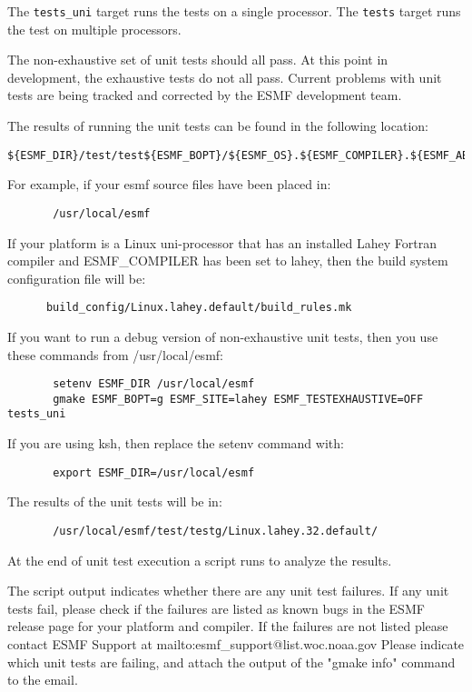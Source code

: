 The {\tt tests\_uni} target runs the tests on a single processor. 
The {\tt tests} target runs the test on multiple processors.

The non-exhaustive set of unit tests should all pass.  At this point in 
development, the exhaustive tests do not all pass.  Current problems with 
unit tests are being tracked and corrected by the ESMF development team.

The results of running the unit tests can be found in the following location:
\begin{verbatim}
${ESMF_DIR}/test/test${ESMF_BOPT}/${ESMF_OS}.${ESMF_COMPILER}.${ESMF_ABI}.${ESMF_SITE}
\end{verbatim}

For example, if your esmf source files have been placed in: 
\begin{verbatim}
       /usr/local/esmf
\end{verbatim}

If your platform is a Linux uni-processor that has an installed Lahey
Fortran compiler and ESMF\_COMPILER has been set to lahey, then the build
system configuration file will be:

\begin{verbatim}
      build_config/Linux.lahey.default/build_rules.mk
\end{verbatim}

If you want to run a debug version of non-exhaustive unit tests,
then you use these commands from /usr/local/esmf:

\begin{verbatim}
       setenv ESMF_DIR /usr/local/esmf
       gmake ESMF_BOPT=g ESMF_SITE=lahey ESMF_TESTEXHAUSTIVE=OFF tests_uni
\end{verbatim}


If you are using ksh, then replace the setenv command with:
\begin{verbatim}
       export ESMF_DIR=/usr/local/esmf
\end{verbatim}

The results of the unit tests will be in:
\begin{verbatim}
       /usr/local/esmf/test/testg/Linux.lahey.32.default/
\end{verbatim}

At the end of unit test execution a script runs to analyze the results.

The script output indicates whether there are any unit test failures.
If any unit tests fail, please check if the failures are listed as known bugs in the ESMF release
page 
for your platform and compiler.
If the failures are not listed please contact ESMF Support at 
{mailto:esmf\_support@list.woc.noaa.gov}
Please indicate which unit tests are failing, and attach the output of the "gmake info" command to the email.


